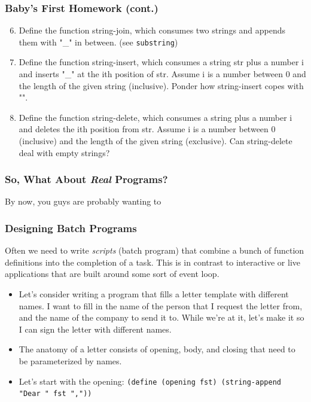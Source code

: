 \documentclass{beamer}
\begin{document}
\begin{frame}
  \frametitle{Baby's First Homework (cont.)}
  \begin{enumerate}
    \setcounter{enumi}{5}
 \item Define the function string-join, which consumes two strings and appends them with "\_" in between. (see \texttt{substring})
  \item Define the function string-insert, which consumes a string str plus a number i and inserts "\_" at the ith position of str. Assume i is a number between 0 and the length of the given string (inclusive). Ponder how string-insert copes with "".
  \item  Define the function string-delete, which consumes a string plus a number i and deletes the ith position from str. Assume i is a number between 0 (inclusive) and the length of the given string (exclusive). Can string-delete deal with empty strings? 
  \end{enumerate}
\end{frame}

\begin{frame}
  \frametitle{So, What About \emph{Real} Programs?}
  By now, you guys are probably wanting to
\end{frame}

\begin{frame}
  \frametitle{Designing Batch Programs}
  Often we need to write \emph{scripts} (batch program) that combine a bunch of
  function definitions into the completion of a task. This is in contrast to
  interactive or live applications that are built around some sort of event loop.
  \begin{itemize}
  \item<2-> Let's consider writing a program that fills a letter template with different names. I want to fill in the name of the person that I request the letter
    from, and the name of the company to send it to. While we're at it, let's
    make it so I can sign the letter with different names.
  \item<3-> The anatomy of a letter consists of opening, body, and closing that
    need to be parameterized by names.
  \item<4-> Let's start with the opening:
    \texttt{(define (opening fst) (string-append "Dear " fst ","))}
  \end{itemize}
\end{frame}

\end{document}
